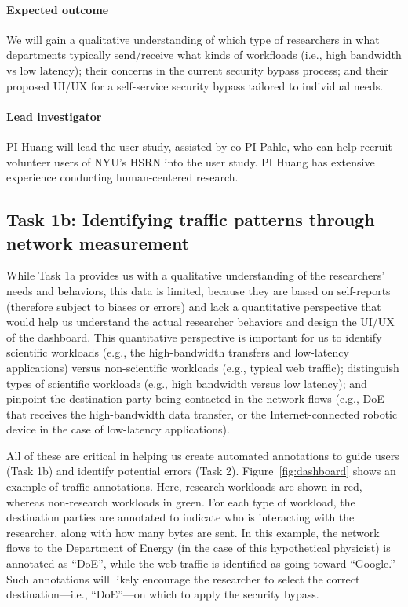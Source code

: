 \paragraph{Expected outcome} We will gain a qualitative understanding of which type of researchers in what departments typically send/receive what kinds of workfloads (i.e., high bandwidth vs low latency); their concerns in the current security bypass process; and their proposed UI/UX for a self-service security bypass tailored to individual needs.



\paragraph{Lead investigator}
PI Huang will lead the user study, assisted by co-PI Pahle, who can help recruit volunteer users of NYU's HSRN into the user study. PI Huang has extensive experience conducting human-centered research.










\subsection{Task 1b: Identifying traffic patterns through network measurement}

While Task 1a provides us with a qualitative understanding of the researchers' needs and behaviors, this data is limited, because they are based on self-reports (therefore subject to biases or errors) and lack a quantitative perspective that would help us understand the actual researcher behaviors and design the UI/UX of the dashboard.
This quantitative perspective is important for us to identify scientific workloads (e.g., the high-bandwidth transfers and low-latency applications) versus non-scientific workloads (e.g., typical web traffic); distinguish types of scientific workloads (e.g., high bandwidth versus low latency); and pinpoint the destination party being contacted in the network flows (e.g., DoE that receives the high-bandwidth data transfer, or the Internet-connected robotic device in the case of low-latency applications).

All of these are critical in helping us create automated annotations to guide users (Task 1b) and identify potential errors (Task 2). Figure~\ref{fig:dashboard} shows an example of traffic annotations. Here, research workloads are shown in red, whereas non-research workloads in green. For each type of workload, the destination parties are annotated to indicate who is interacting with the researcher, along with how many bytes are sent. In this example, the network flows to the Department of Energy (in the case of this hypothetical physicist) is annotated as ``DoE'', while the web traffic is identified as going toward ``Google.'' Such annotations will likely encourage the researcher to select the correct destination---i.e., ``DoE''---on which to apply the security bypass.

